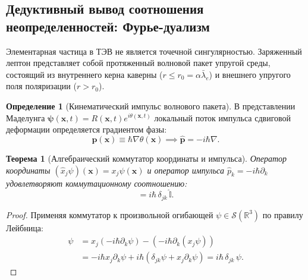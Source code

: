 \documentclass[11pt,a4paper]{article}
\providecommand{\lambdabar}{\bar{\lambda}}
\newtheorem{theorem}{Теорема}
\theoremstyle{definition}
\newtheorem{definition}{Определение}
\theoremstyle{remark}
\begin{document}
\subsection{Дедуктивный вывод соотношения неопределенностей: Фурье-дуализм}

Элементарная частица в ТЭВ не является точечной сингулярностью. Заряженный лептон представляет собой протяженный волновой пакет упругой среды, состоящий из внутреннего керна каверны ($r \le r_0 = \alpha \lambdabar_e$) и внешнего упругого поля поляризации ($r > r_0$).

\begin{definition}[Кинематический импульс волнового пакета]
	В представлении Маделунга $\boldsymbol{\psi}(\mathbf{x}, t) = R(\mathbf{x}, t) e^{i\theta(\mathbf{x}, t)}$ локальный поток импульса сдвиговой деформации определяется градиентом фазы:
	\begin{equation}
\mathbf{p}(\mathbf{x}) \equiv \hbar \nabla\theta(\mathbf{x}) \implies \hat{\mathbf{p}} = -i\hbar \nabla.
\label{eq:quantum_momentum_operator}
	\end{equation}
\end{definition}

\begin{theorem}[Алгебраический коммутатор координаты и импульса]
\label{thm:canonical_commutator_exact}
Оператор координаты $(\hat{x}_j \psi)(\mathbf{x}) = x_j \psi(\mathbf{x})$ и оператор импульса $\hat{p}_k = -i\hbar \partial_k$ удовлетворяют коммутационному соотношению:
\begin{equation}
	[\hat{x}_j, \hat{p}_k] = i\hbar \, \delta_{jk} \, \hat{\mathbb{I}}.
	\label{eq:canonical_commutator}
\end{equation}
\end{theorem}
\begin{proof}
Применяя коммутатор к произвольной огибающей $\psi \in \mathcal{S}(\mathbb{R}^3)$ по правилу Лейбница:
\begin{align}
	[\hat{x}_j, \hat{p}_k] \psi &= x_j (-i\hbar \partial_k \psi) - (-i\hbar \partial_k (x_j \psi)) \nonumber \\
	&= -i\hbar x_j \partial_k \psi + i\hbar (\delta_{jk} \psi + x_j \partial_k \psi) = i\hbar \, \delta_{jk} \, \psi.
\end{align}
\end{proof}
\end{document}
